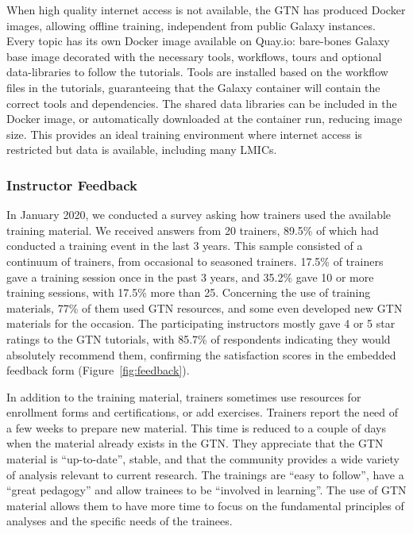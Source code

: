 \documentclass[10pt,letterpaper]{article}
\begin{document}
When high quality internet access is not available, the GTN has produced Docker images, allowing offline training, independent from public Galaxy instances.
Every topic has its own Docker image available on Quay.io:  bare-bones Galaxy base image decorated with the necessary tools, workflows, tours and optional data-libraries to follow the tutorials.
Tools are installed based on the workflow files in the tutorials, guaranteeing that the Galaxy container will contain the correct tools and dependencies.
The shared data libraries can be included in the Docker image, or automatically downloaded at the container run, reducing image size.
This provides an ideal training environment where internet access is restricted but data is available, including many LMICs.

\subsubsection*{Instructor Feedback}

In January 2020, we conducted a survey asking how trainers used the available training material. We received answers from 20 trainers, 89.5\% of which had conducted a training event in the last 3 years.
This sample consisted of a continuum of trainers, from occasional to seasoned trainers. 17.5\% of trainers gave a training session once in the past 3 years, and 35.2\% gave 10 or more training sessions, with 17.5\% more than 25.
Concerning the use of training materials, 77\% of them used GTN resources, and some even developed new GTN materials for the occasion. 
The participating instructors mostly gave 4 or 5 star ratings to the GTN tutorials, with 85.7\% of respondents indicating they would absolutely recommend them, confirming the satisfaction scores in the embedded feedback form (Figure~\ref{fig:feedback}).

In addition to the training material, trainers sometimes use resources for enrollment forms and certifications, or add exercises.
Trainers report the need of a few weeks to prepare new material.
This time is reduced to a couple of days when the material already exists in the GTN.
They appreciate that the GTN material is “up-to-date”, stable, and that the community provides a wide variety of analysis relevant to current research.
The trainings are “easy to follow”, have a “great pedagogy” and allow trainees to be “involved in learning”.
The use of GTN material allows them to have more time to focus on the fundamental principles of  analyses and the specific needs of the trainees.
\end{document}

